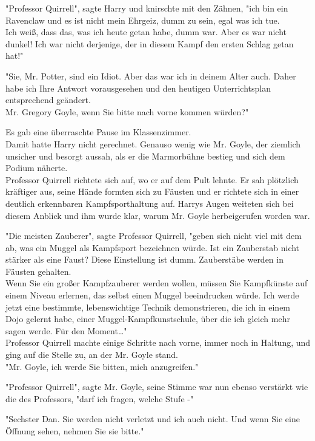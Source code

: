 {"Professor Quirrell", sagte Harry und knirschte mit den Zähnen, "ich bin ein Ravenclaw und es ist nicht mein Ehrgeiz, dumm zu sein, egal was ich tue.\\ Ich weiß, dass das, was ich heute getan habe, dumm war. Aber es war nicht dunkel! Ich war nicht derjenige, der in diesem Kampf den ersten Schlag getan hat!"

"Sie, Mr. Potter, sind ein Idiot. Aber das war ich in deinem Alter auch. Daher habe ich Ihre Antwort vorausgesehen und den heutigen Unterrichtsplan entsprechend geändert.\\ Mr. Gregory Goyle, wenn Sie bitte nach vorne kommen würden?"

Es gab eine überraschte Pause im Klassenzimmer.\\ Damit hatte Harry nicht gerechnet. Genauso wenig wie Mr. Goyle, der ziemlich unsicher und besorgt aussah, als er die Marmorbühne bestieg und sich dem Podium näherte.\\ Professor Quirrell richtete sich auf, wo er auf dem Pult lehnte. Er sah plötzlich kräftiger aus, seine Hände formten sich zu Fäusten und er richtete sich in einer deutlich erkennbaren Kampfsporthaltung auf. Harrys Augen weiteten sich bei diesem Anblick und ihm wurde klar, warum Mr. Goyle herbeigerufen worden war.

"Die meisten Zauberer", sagte Professor Quirrell, "geben sich nicht viel mit dem ab, was ein Muggel als Kampfsport bezeichnen würde. Ist ein Zauberstab nicht stärker als eine Faust? Diese Einstellung ist dumm. Zauberstäbe werden in Fäusten gehalten.\\ Wenn Sie ein großer Kampfzauberer werden wollen, müssen Sie Kampfkünste auf einem Niveau erlernen, das selbst einen Muggel beeindrucken würde. Ich werde jetzt eine bestimmte, lebenswichtige Technik demonstrieren, die ich in einem Dojo gelernt habe, einer Muggel-Kampfkunstschule, über die ich gleich mehr sagen werde. Für den Moment…"\\ Professor Quirrell machte einige Schritte nach vorne, immer noch in Haltung, und ging auf die Stelle zu, an der Mr. Goyle stand.\\ "Mr. Goyle, ich werde Sie bitten, mich anzugreifen."

"Professor Quirrell", sagte Mr. Goyle, seine Stimme war nun ebenso verstärkt wie die des Professors, "darf ich fragen, welche Stufe -"

"Sechster Dan. Sie werden nicht verletzt und ich auch nicht. Und wenn Sie eine Öffnung sehen, nehmen Sie sie bitte."

}
